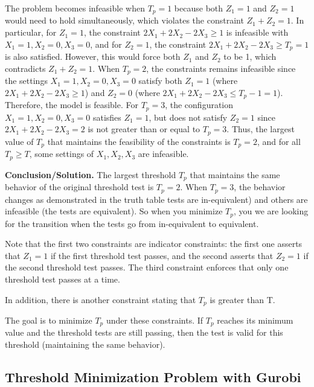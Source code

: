 \documentclass[]{article}
\begin{document}
The problem becomes infeasible when \( T_p = 1 \) because both \( Z_1 = 1 \) and \( Z_2 = 1 \) would need to hold simultaneously, which violates the constraint \( Z_1 + Z_2 = 1 \). In particular, for \( Z_1 = 1 \), the constraint \( 2X_1 + 2X_2 - 2X_3 \geq 1 \) is infeasible with \( X_1 = 1, X_2 = 0, X_3 = 0 \), and for \( Z_2 = 1 \), the constraint \( 2X_1 + 2X_2 - 2X_3 \geq T_p = 1 \) is also satisfied. However, this would force both \( Z_1 \) and \( Z_2 \) to be 1, which contradicts \( Z_1 + Z_2 = 1 \). When \( T_p = 2 \), the constraints remains infeasible since the settings \( X_1 = 1, X_2 = 0, X_3 = 0 \) satisfy both \( Z_1 = 1 \) (where \( 2X_1 + 2X_2 - 2X_3 \geq 1 \)) and \( Z_2 = 0 \) (where \( 2X_1 + 2X_2 - 2X_3 \leq T_p - 1 = 1 \)). Therefore, the model is feasible. For \( T_p = 3 \), the configuration \( X_1 = 1, X_2 = 0, X_3 = 0 \) satisfies \( Z_1 = 1 \), but does not satisfy \( Z_2 = 1 \) since \( 2X_1 + 2X_2 - 2X_3 = 2 \) is not greater than or equal to \( T_p = 3 \). Thus, the largest value of \( T_p \) that maintains the feasibility of the constraints is \( T_p = 2 \), and for all \( T_p \geq T \), some settings of \( X_1, X_2, X_3 \) are infeasible.


\textbf{Conclusion/Solution.} The largest threshold \(T_p\) that maintains the same behavior of the original threshold test is \(T_p = 2\). When \(T_p = 3\), the behavior changes as demonstrated in the truth table tests are in-equivalent) and others are infeasible (the tests are equivalent).  So when you minimize \(T_p\), you we are looking for the transition when the tests go from in-equivalent to equivalent.

Note that the first two constraints are indicator constraints: the first one asserts that \(Z_1 = 1\) if the first threshold test passes, and the second asserts that \(Z_2 = 1\) if the second threshold test passes. The third constraint enforces that only one threshold test passes at a time. 

In addition, there is another constraint stating that \(T_p\) is greater than T.

The goal is to minimize \(T_p\) under these constraints. If \(T_p\) reaches its minimum value and the threshold tests are still passing, then the test is valid for this threshold (maintaining the same behavior).


\newpage
\subsection*{Threshold Minimization Problem with Gurobi}
\end{document}
